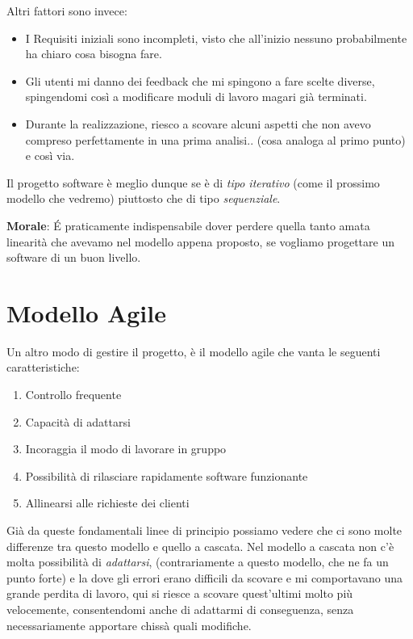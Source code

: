 \documentclass[oneside]{book}
\begin{document}
		\newpage

		Altri fattori sono invece:
		\begin{itemize}
			\item  I Requisiti iniziali sono incompleti, visto che all'inizio nessuno probabilmente ha chiaro cosa bisogna fare.
			\item Gli utenti mi danno dei feedback che mi spingono a fare scelte diverse, spingendomi così a modificare moduli di lavoro magari già terminati.
			\item Durante la realizzazione, riesco a scovare alcuni aspetti che non avevo compreso perfettamente in una prima analisi.. (cosa analoga al primo punto) e così via.
		\end{itemize}
		Il progetto software è meglio dunque se è di \emph{tipo iterativo} (come il prossimo modello che vedremo) piuttosto che di tipo \emph{sequenziale}. \\

		\begin{em}
		\small{\textbf{Morale}: É praticamente indispensabile dover perdere quella tanto amata linearità che avevamo nel modello appena proposto, se vogliamo progettare un software di un buon livello.}
		\end{em}

	\section{Modello Agile}
		Un altro modo di gestire il progetto, è il modello agile che vanta le seguenti caratteristiche:
		\begin{enumerate}
		\item Controllo frequente
		\item Capacità di adattarsi
		\item Incoraggia il modo di lavorare in gruppo 
		\item Possibilità di rilasciare rapidamente software funzionante
		\item Allinearsi alle richieste dei clienti
		\end{enumerate}
		Già da queste fondamentali linee di principio possiamo vedere che ci sono molte differenze tra questo modello e quello a cascata. Nel modello a cascata non c'è molta possibilità di \emph{adattarsi}, (contrariamente a questo modello, che ne fa un punto forte) e la dove gli errori erano difficili da scovare e mi comportavano una grande perdita di lavoro, qui si riesce a scovare quest'ultimi molto più velocemente, consentendomi anche di adattarmi di conseguenza, senza necessariamente apportare chissà quali modifiche. \\
\end{document}

